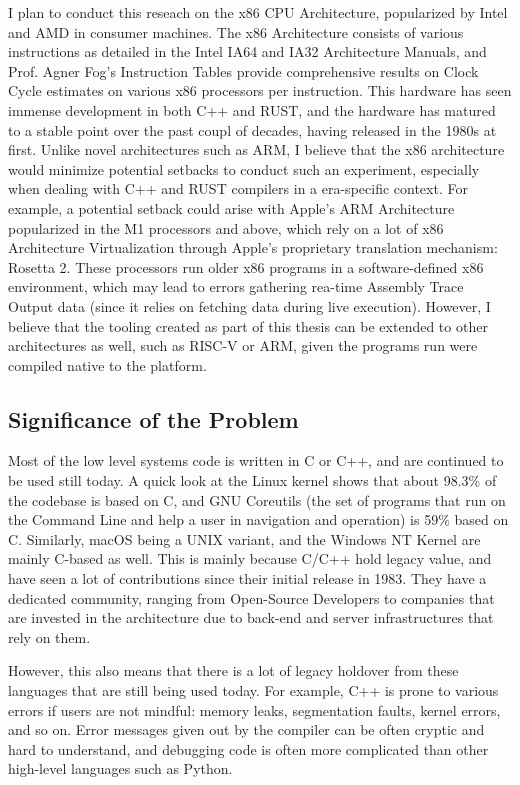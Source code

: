 \documentclass[conference]{IEEEtran}
\begin{document}
I plan to conduct this reseach on the x86 CPU Architecture, popularized by Intel and AMD in consumer machines. The x86 Architecture consists of various instructions as detailed in the Intel IA64 and IA32 Architecture Manuals\cite{b2}, and Prof. Agner Fog's Instruction Tables provide comprehensive results on Clock Cycle estimates on various x86 processors per instruction\cite{b3}. This hardware has seen immense development in both C++ and RUST, and the hardware has matured to a stable point over the past coupl of decades, having released in the 1980s at first\cite{b4}. Unlike novel architectures such as ARM, I believe that the x86 architecture would minimize potential setbacks to conduct such an experiment, especially when dealing with C++ and RUST compilers in a era-specific context. For example, a potential setback could arise with Apple's ARM Architecture popularized in the M1 processors and above, which rely on a lot of x86 Architecture Virtualization through Apple's proprietary translation mechanism: Rosetta 2\cite{b5}. These processors run older x86 programs in a software-defined x86 environment, which may lead to errors gathering rea-time Assembly Trace Output data (since it relies on fetching data during live execution). However, I believe that the tooling created as part of this thesis can be extended to other architectures as well, such as RISC-V or ARM, given the programs run were compiled native to the platform. 

\subsection{Significance of the Problem}

Most of the low level systems code is written in C or C++, and are continued to be used still today. A quick look at the Linux kernel shows that about 98.3\% of the codebase is based on C\cite{b6}, and GNU Coreutils (the set of programs that run on the Command Line and help a user in navigation and operation) is 59\% based on C\cite{b7}. Similarly, macOS being a UNIX variant, and the Windows NT Kernel are mainly C-based as well\cite{b8}. This is mainly because C/C++ hold legacy value, and have seen a lot of contributions since their initial release in 1983. They have a dedicated community, ranging from Open-Source Developers to companies that are invested in the architecture due to back-end and server infrastructures that rely on them.

However, this also means that there is a lot of legacy holdover from these languages that are still being used today. For example, C++ is prone to various errors if users are not mindful: memory leaks, segmentation faults, kernel errors, and so on. Error messages given out by the compiler can be often cryptic and hard to understand, and debugging code is often more complicated than other high-level languages such as Python. 
\end{document}
